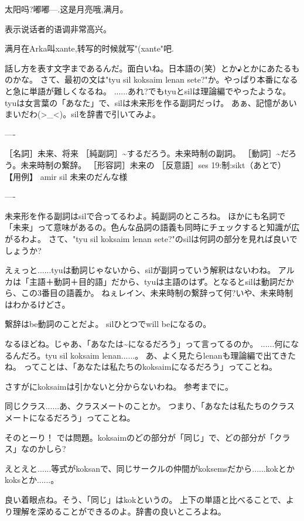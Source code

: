 太阳吗?嘟嘟---.这是月亮哦,满月。

表示说话者的语调非常高兴。

满月在Arka叫xante,转写的时候就写"(xante"吧.


話し方を表す文字まであるんだ。面白いね。日本語の(笑）とか♪とかにあたるものかな。
さて、最初の文は"tyu sil koksaim lenan sete?"か。やっぱり本番になると急に単語が難しくなるね。
......あれ?でもtyuとsilは理論編でやったような。tyuは女言葉の「あなた」で、silは未来形を作る副詞だっけ。
あぁ、記憶があいまいだわ(>\_<)。silを辞書で引いてみよ。

----

［名詞］未来、将来
［純副詞］\~{}するだろう。未来時制の副詞。
［動詞］\~{}だろう。未来時制の繋辞。
［形容詞］未来の
［反意語］ses
19:制:sikt（あとで）
【用例】
amir sil 未来のだんな様


----

未来形を作る副詞はsilで合ってるわよ。純副詞のところね。
ほかにも名詞で「未来」って意味があるの。色んな品詞の語義も同時にチェックすると知識が広がるわよ。
さて、"tyu sil koksaim lenan sete?"のsilは何詞の部分を見れば良いでしょうか?


えぇっと......tyuは動詞じゃないから、silが副詞っていう解釈はないわね。
アルカは「主語＋動詞＋目的語」だから、tyuは主語のはず。となるとsilは動詞だから、この3番目の語義か。
ねぇレイン、未来時制の繋辞って何?いや、未来時制はわかるけどさ。


繋辞はbe動詞のことだよ。
silひとつでwill beになるの。


なるほどね。じゃあ、「あなたは\~{}になるだろう」って言ってるのか。
......何になるんだろ。tyu sil koksaim lenan......。
あ、よく見たらlenanも理論編で出てきたね。%
ってことは、「あなたは私たちのkoksaimになるだろう」ってことね。


さすがにkoksaimは引かないと分からないわね。
参考までに。

同じクラス......あ、クラスメートのことか。
つまり、「あなたは私たちのクラスメートになるだろう」ってことね。


    そのとーり！
    では問題。koksaimのどの部分が「同じ」で、どの部分が「クラス」なのかしら?


えとえと......等式がkoksanで、同じサークルの仲間がkoksemsだから......kokとかkoksとか......。


良い着眼点ね。そう、「同じ」はkokというの。
上下の単語と比べることで、より理解を深めることができるのよ。辞書の良いところよね。


